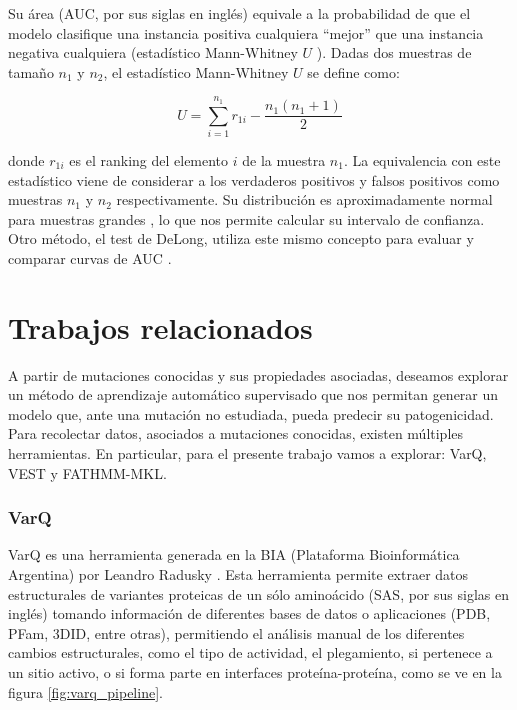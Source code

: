 \begin{itemize}
    Su área (AUC, por sus siglas en inglés) equivale a la probabilidad de que el modelo clasifique una instancia positiva cualquiera ``mejor'' que una instancia negativa cualquiera (estadístico Mann-Whitney $U$ \cite{doi:10.1256/003590002320603584}). Dadas dos muestras de tamaño $n_1$ y $n_2$, el estadístico Mann-Whitney $U$ se define como:
    
    \begin{equation*}
        U = \sum_{i = 1}^{n_1} r_{1i} - \frac{n_1 (n_1 + 1)}{2}
    \end{equation*}
    
    donde $r_{1i}$ es el ranking del elemento $i$ de la muestra $n_1$. La equivalencia con este estadístico viene de considerar a los verdaderos positivos y falsos positivos como muestras $n_1$ y $n_2$ respectivamente. Su distribución es aproximadamente normal para muestras grandes \cite{mann1947}, lo que nos permite calcular su intervalo de confianza. Otro método, el test de DeLong, utiliza este mismo concepto para evaluar y comparar curvas de AUC \cite{DeLong}.

\end{itemize}



\section{Trabajos relacionados}

A partir de mutaciones conocidas y sus propiedades asociadas, deseamos explorar un método de aprendizaje automático supervisado que nos permitan generar un modelo que, ante una mutación no estudiada, pueda predecir su patogenicidad. Para recolectar datos, asociados a mutaciones conocidas, existen múltiples herramientas. En particular, para el presente trabajo vamos a explorar: VarQ, VEST y FATHMM-MKL.

\subsubsection{VarQ}

VarQ es una herramienta generada en la BIA (Plataforma Bioinformática Argentina) por Leandro Radusky \cite{Radusky2017}. Esta herramienta permite extraer datos estructurales de variantes proteicas de un sólo aminoácido (SAS, por sus siglas en inglés) tomando información de diferentes bases de datos o aplicaciones (PDB, PFam, 3DID, entre otras), permitiendo el análisis manual de los diferentes cambios estructurales, como el tipo de actividad, el plegamiento, si pertenece a un sitio activo, o si forma parte en interfaces proteína-proteína, como se ve en la figura \ref{fig:varq_pipeline}. 

